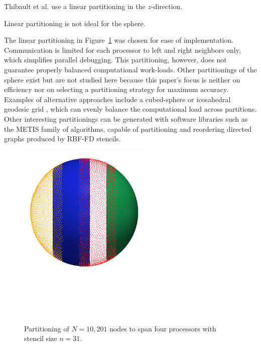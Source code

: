 \documentclass{report}
\begin{document}
Thibault et al. \cite{Thibault200*} use a linear partitioning in the $z$-direction. 

Linear partitioning is not ideal for the sphere. 



The linear partitioning in Figure~\ref{fig:decomposed_sphere} was chosen for ease of implementation. Communication is limited for each
processor to left and right neighbors only, which simplifies parallel debugging. This partitioning, however, does not guarantee properly balanced computational work-loads.  Other partitionings of the sphere exist but are not studied here because this paper's focus is neither on efficiency nor on selecting a partitioning strategy for maximum accuracy. Examples of alternative approaches include a cubed-sphere \cite{Ivan2011} or icosahedral geodesic grid \cite{Randall2002}, which can evenly balance the computational load across partitions. Other interesting partitionings can be generated with software libraries such as the METIS \cite{Karypis1999} family of algorithms, capable of partitioning and reordering directed graphs produced by RBF-FD stencils. 

\begin{figure}[ht!]
\begin{center}
\includegraphics[width=2.5in]{../figures/paper1/figures/vortex_rollup/4procs_N10K_n31.pdf}
\caption{Partitioning of $N=10,201$ nodes to span four processors with stencil size $n=31$. }
\label{fig:decomposed_sphere}
\end{center}
\end{figure}
\end{document}

